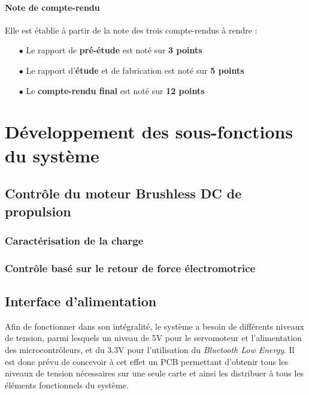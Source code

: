 \documentclass[a4paper,12pt]{report}
\begin{document}
			\vspace{-1.5em}
			
			\paragraph{Note de compte-rendu}
			
			Elle est établie à partir de la note des trois compte-rendus à rendre :
			
			\begin{itemize}
				\item[$\bullet$] Le rapport de \textbf{pré-étude} est noté sur \textbf{3 points}
				\item[$\bullet$] Le rapport d'\textbf{étude} et de fabrication est noté sur \textbf{5 points}
				\item[$\bullet$] Le \textbf{compte-rendu final} est noté sur \textbf{12 points}
			\end{itemize}
	
	\section{Développement des sous-fonctions du système}
	
		
		\subsection{Contrôle du moteur Brushless DC de propulsion}
		
			\subsubsection{Caractérisation de la charge}
			
			\subsubsection{Contrôle basé sur le retour de force électromotrice}
	
		\subsection{Interface d'alimentation}
		
		Afin de fonctionner dans son intégralité, le système a besoin de différents niveaux de tension, parmi lesquels un niveau de 5V pour le servomoteur et l'alimentation des microcontrôleurs, et du 3.3V pour l'utilisation du \textit{Bluetooth Low Energy}. Il est donc prévu de concevoir à cet effet un PCB permettant d'obtenir tous les niveaux de tension nécessaires sur une seule carte et ainsi les distribuer à tous les éléments fonctionnels du système.
		
\end{document}
